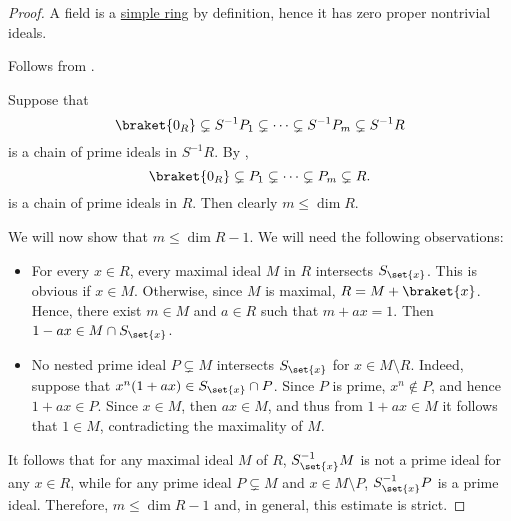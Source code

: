 \begin{proof}
   A field is a \hyperref[def:ring/simple]{simple ring} by definition, hence it has zero proper nontrivial ideals.

   Follows from .

   Suppose that
  \begin{equation*}
    \braket{ 0_R } \subsetneq S^{-1} P_1 \subsetneq \cdots \subsetneq S^{-1} P_m \subsetneq S^{-1} R
  \end{equation*}
  is a chain of prime ideals in \( S^{-1} R \). By ,
  \begin{equation*}
    \braket{ 0_R } \subsetneq P_1 \subsetneq \cdots \subsetneq P_m \subsetneq R.
  \end{equation*}
  is a chain of prime ideals in \( R \). Then clearly \( m \leq \dim R \).

  We will now show that \( m \leq \dim R - 1 \). We will need the following observations:
  \begin{itemize}
    \item For every \( x \in R \), every maximal ideal \( M \) in \( R \) intersects \( S_{\set{ x }} \). This is obvious if \( x \in M \). Otherwise, since \( M \) is maximal, \( R = M + \braket{ x } \). Hence, there exist \( m \in M \) and \( a \in R \) such that \( m + ax = 1 \). Then \( 1 - ax \in M \cap S_{\set{ x }} \).

    \item No nested prime ideal \( P \subsetneq M \) intersects \( S_{\set{ x }} \) for \( x \in M \setminus R \). Indeed, suppose that \( x^n(1 + ax) \in S_{\set{ x }} \cap P \). Since \( P \) is prime, \( x^n \not\in P \), and hence \( 1 + ax \in P \). Since \( x \in M \), then \( ax \in M \), and thus from \( 1 + ax \in M \) it follows that \( 1 \in M \), contradicting the maximality of \( M \).
  \end{itemize}

  It follows that for any maximal ideal \( M \) of \( R \), \( S_{\set{ x }}^{-1} M \) is not a prime ideal for any \( x \in R \), while for any prime ideal \( P \subsetneq M \) and \( x \in M \setminus P \), \( S_{\set{ x }}^{-1} P \) is a prime ideal. Therefore, \( m \leq \dim R - 1 \) and, in general, this estimate is strict.



\end{proof}
